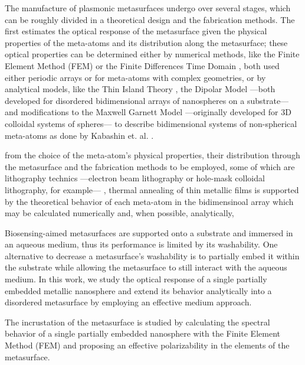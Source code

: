 The manufacture of plasmonic metasurfaces undergo over several stages, which can be roughly divided in a theoretical design and the fabrication methods. The first estimates the optical response of the metasurface given the physical properties of the meta-atoms and its distribution along the metasurface; these optical properties can be determined either by numerical methods, like the Finite Element Method (FEM) \cite{feuz_improving_2010} or the Finite Differences Time Domain \cite{qiu_differential_2015}, both used either periodic arrays or for meta-atoms with complex geometries, or by analytical models, like the Thin Island Theory \cite{svedendahl_refractometric_2014,bedeaux_optical_2004}, the Dipolar Model \cite{barrera1991optical} ---both developed for disordered bidimensional arrays of nanospheres on a substrate--- and modifications to the  Maxwell Garnett Model \cite{sihvola_electromagnetic_2008}  ---originally developed for 3D colloidal systems of spheres--- to describe bidimensional systems of non-spherical meta-atoms as done by Kabashin et. al. \cite{kabashin_plasmonic_2009}.


 from the choice of the meta-atom's physical properties, their distribution through the metasurface and the fabrication methods to be employed, some of which are lithography technics ---electron beam lithography or hole-mask colloidal lithography, for example--- \cite{estevez_trends_2014}, thermal annealing of thin metallic films \cite{qiu_dual_2020}
is supported by the theoretical behavior of each meta-atom in the bidimensinoal array which may be calculated numerically and, when possible, analytically, 

Biosensing-aimed metasurfaces are supported onto a substrate and immersed in an aqueous medium, thus its performance is limited by its washability. One alternative to decrease a metasurface's washability is to partially embed it within the substrate while allowing the metasurface to still interact with the aqueous medium. In this work, we study the optical response of a single partially embedded metallic nanosphere  and extend its behavior analytically into a disordered metasurface by employing an effective medium approach.

The incrustation of the metasurface is studied by calculating the spectral behavior of a single partially embedded nanosphere with the Finite Element Method (FEM) and proposing an effective polarizability  in the elements of the metasurface.

